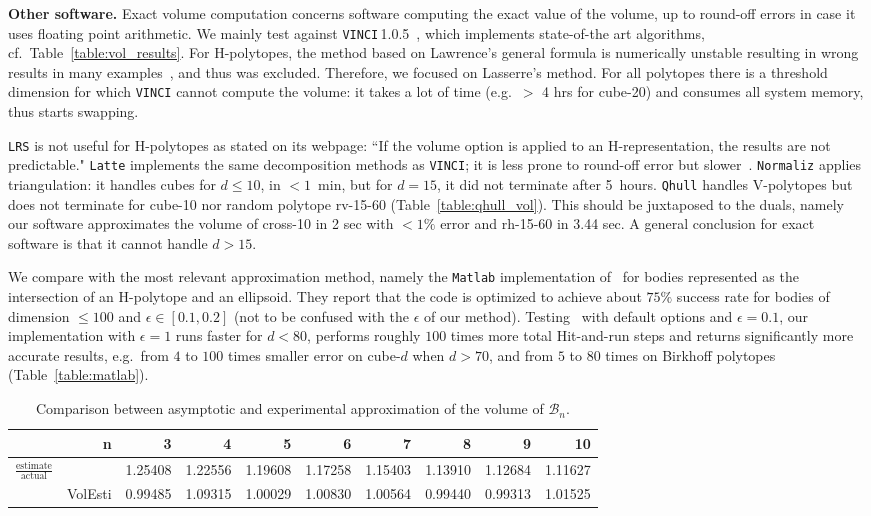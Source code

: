 \documentclass[11pt,a4paper]{article}
\def\B{{\mathcal B}} \def\E{{\mathcal E}}
\begin{document}
\vspace{.5em}
\textbf{Other software.}
Exact volume computation concerns software computing the exact value of
the volume, up to round-off errors in case it uses floating point arithmetic. 
We mainly test against {\tt VINCI}\,1.0.5~\cite{vinci}, which implements
state-of-the art algorithms, cf.\ Table~\ref{table:vol_results}.
For H-polytopes, the method based on Lawrence's general formula 
is numerically unstable resulting in wrong results in many examples~\cite{FukVolume00},
and thus was excluded.
Therefore, we focused on Lasserre's method. 
For all polytopes there is a threshold dimension for which
{\tt VINCI} cannot compute the volume:
it takes a lot of time (e.g.\ $>$ 4 hrs for cube-20) and 
consumes all system memory, thus starts swapping.

{\tt LRS} is not useful for H-polytopes as stated on its webpage:
``If the volume option
is applied to an H-representation, the results are not predictable."
{\tt Latte} implements the same decomposition methods
as {\tt VINCI}; it is less prone to round-off error but slower~\cite{Latte}.
{\tt Normaliz} applies triangulation:
it handles cubes for $d\le 10$, in $<1$~min,
but for $d=15$, it did not terminate after 5~hours.
{\tt Qhull} handles V-polytopes
but does not terminate for cube-10 nor random polytope rv-15-60
(Table~\ref{table:qhull_vol}). 
This should be juxtaposed to the duals, namely
our software approximates the volume of cross-10 in 2 sec with $<1\%$ error and 
rh-15-60 in 3.44 sec.
A general conclusion for exact software is that it cannot handle
$d> 15$.

We compare with the most relevant approximation method, namely the
{\tt Matlab} implementation of~\cite{CousinsV13_matlab} for bodies
represented as the intersection of an H-polytope and an ellipsoid.
They report that the code is optimized to achieve about $75\%$ success
rate for bodies of dimension $\le 100$ and $\epsilon\in [0.1, 0.2]$ (not to be confused with the $\epsilon$ of our method).
Testing~\cite{CousinsV13_matlab} with default options and
$\epsilon=0.1$, our implementation with $\epsilon=1$ runs faster for $d<80$, performs  roughly $100$ times more total Hit-and-run steps and returns significantly
more accurate results, e.g.\ from $4$ to $100$ times smaller error
on cube-$d$ when $d>70$, and from $5$ to $80$ times on Birkhoff polytopes (Table~\ref{table:matlab}).

\begin{table}[t!]\centering\small
\begin{tabular}{rr|rrrrrrrr}
& n & 3 & 4 & 5 & 6 & 7 & 8 & 9 & 10\\\hline
\multirow{2}{1cm}{$\frac{\text{estimate}}{\text{actual}}$} & \cite{GMcKay09} & 1.25408 & 1.22556 & 1.19608 & 1.17258 & 1.15403 & 1.13910 & 1.12684 & 1.11627\\
& VolEsti & 0.99485 & 1.09315 & 1.00029 & 1.00830 & 1.00564 & 0.99440 & 0.99313 & 1.01525\\  
\end{tabular} 
\caption{ Comparison between asymptotic and experimental approximation of the volume of $\B_n$.
\label{table:birk_asymptotic}}
\end{table}
\end{document}

